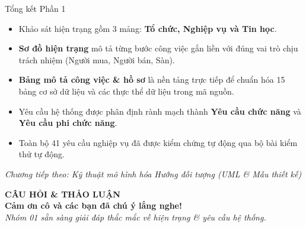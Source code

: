 \documentclass[aspectratio=169, 10pt]{beamer}
\begin{document}
\begin{frame}{Tổng kết Phần 1}
    \begin{itemize}
        \item Khảo sát hiện trạng gồm 3 mảng: \textbf{Tổ chức, Nghiệp vụ và Tin học}.
        \item \textbf{Sơ đồ hiện trạng} mô tả từng bước công việc gắn liền với đúng vai trò chịu trách nhiệm (Người mua, Người bán, Sàn).
        \item \textbf{Bảng mô tả công việc \& hồ sơ} là nền tảng trực tiếp để chuẩn hóa 15 bảng cơ sở dữ liệu và các thực thể dữ liệu trong mã nguồn.
        \item Yêu cầu hệ thống được phân định rành mạch thành \textbf{Yêu cầu chức năng} và \textbf{Yêu cầu phi chức năng}.
        \item Toàn bộ 41 yêu cầu nghiệp vụ đã được kiểm chứng tự động qua bộ bài kiểm thử tự động.
    \end{itemize}
    \vspace{0.3cm}
    \begin{center}
        \textit{\color{secondarySlate}Chương tiếp theo: Kỹ thuật mô hình hóa Hướng đối tượng (UML \& Mẫu thiết kế)}
    \end{center}
\end{frame}

\begin{frame}
    \begin{center}
        \vspace{1.5cm}
        {\huge \textbf{\color{primaryNavy}CÂU HỎI \& THẢO LUẬN}}\\[0.8cm]
        {\large \textbf{Cảm ơn cô và các bạn đã chú ý lắng nghe!}}\\[0.5cm]
        \textit{\color{secondarySlate}Nhóm 01 sẵn sàng giải đáp thắc mắc về hiện trạng \& yêu cầu hệ thống.}
    \end{center}
\end{frame}
\end{document}
